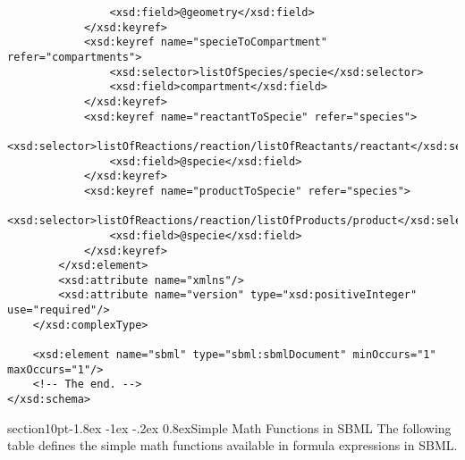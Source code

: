 \documentclass[10pt]{article}
\makeatletter
\renewcommand{\section}{\@startsection%
  {section}{1}{0pt}{-1.8ex \@plus -1ex \@minus -.2ex}%
  {0.8ex}{\normalfont\Large\bfseries}}
\newcommand{\regularspacing}{\renewcommand{\baselinestretch}{1.0}}
\makeatother
\begin{document}
\begin{small}
\begin{verbatim}
                <xsd:field>@geometry</xsd:field>
            </xsd:keyref>
            <xsd:keyref name="specieToCompartment" refer="compartments">
                <xsd:selector>listOfSpecies/specie</xsd:selector>
                <xsd:field>compartment</xsd:field>
            </xsd:keyref>
            <xsd:keyref name="reactantToSpecie" refer="species">
                <xsd:selector>listOfReactions/reaction/listOfReactants/reactant</xsd:selector>
                <xsd:field>@specie</xsd:field>
            </xsd:keyref>
            <xsd:keyref name="productToSpecie" refer="species">
                <xsd:selector>listOfReactions/reaction/listOfProducts/product</xsd:selector>
                <xsd:field>@specie</xsd:field>
            </xsd:keyref>
        </xsd:element>
        <xsd:attribute name="xmlns"/>
        <xsd:attribute name="version" type="xsd:positiveInteger" use="required"/>
    </xsd:complexType>

    <xsd:element name="sbml" type="sbml:sbmlDocument" minOccurs="1" maxOccurs="1"/>
    <!-- The end. -->
</xsd:schema>

\end{verbatim}
\regularspacing
\end{small}

\section{Simple Math Functions in SBML}
\label{appendix:simplemath}
The following table defines the simple math functions available in formula expressions in SBML.
\end{document}
